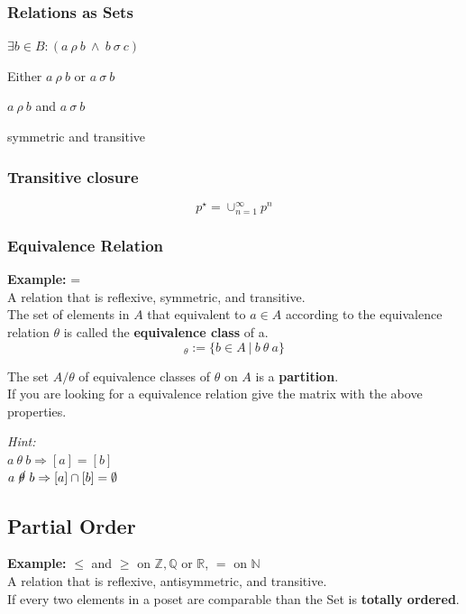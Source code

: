 \documentclass[11pt]{article}
\begin{document}
\subsubsection{Relations as Sets}

\begin{description}[labelindent=16pt,style=multiline,leftmargin=4.5cm, noitemsep]
	\item[$a\ \rho\sigma\ b$:] $\exists b\in B: (a\ \rho\ b\ \land\ b\ \sigma\ c)$
	\item[$a\ (\rho\cup\sigma)\ b$:] Either $a\ \rho\ b$ or $a\ \sigma\ b$
	\item[$a\ (\rho\cap\sigma)\ b$:] $a\ \rho\ b$ and $a\ \sigma\ b$
	\item[The empty set $\emptyset$:] symmetric and transitive
\end{description}
\subsubsection{Transitive closure}
\begin{equation}
	p^\star = \cup^\infty_{n=1}p^n
\end{equation}

\subsubsection{Equivalence Relation}
\textbf{Example:} = \\ 
A relation that is reflexive, symmetric, and transitive.\\

The set of elements in $A$ that equivalent to $a \in A$ according to the equivalence relation $\theta$ is called the \textbf{equivalence class} of a.
\begin{equation*}
	[a]_\theta := \{b \in A\ |\ b\ \theta\ a \}
\end{equation*}

The set $A/\theta$ of equivalence classes of $\theta$ on $A$ is a \textbf{partition}. \\
If you are looking for a equivalence relation give the matrix with the above properties.

\emph{Hint:}\\
$a\ \theta\ b \Rightarrow [a] = [b]$\\
$a\ \cancel{\theta}\ b \Rightarrow [a] \cap [b] = \emptyset$

\subsection{Partial Order}
\textbf{Example:} $\leq$ and $\geq$ on $\mathbb{Z}, \mathbb{Q}$ or $\mathbb{R}$, $=$ on $\mathbb{N}$\\ 
A relation that is reflexive, antisymmetric, and transitive. \\
If every two elements in a poset are comparable than the Set is \textbf{totally ordered}.\\
\end{document}
